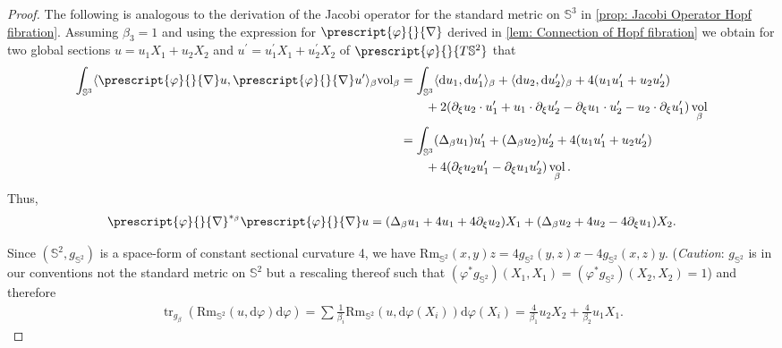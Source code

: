 \documentclass{article}
\numberwithin{equation}{section}        %
\theoremstyle{bfnote}
\theoremstyle{definition}
\theoremstyle{bfremark}
\newcommand{\Sp}{\mathbb{S}}                %
\newcommand{\diff}{\mathrm{d}}                      %
\DeclareMathOperator{\vol}{vol}                 %
\DeclareMathOperator{\tr}{tr}                   %
\begin{document}
\begin{proof}
    The following is analogous to the derivation of the Jacobi operator for the standard metric on $\Sp^3$ in \cref{prop: Jacobi Operator Hopf fibration}. Assuming $\beta_3=1$ and using the expression for $\prescript{\varphi}{}{\nabla}$ derived in \cref{lem: Connection of Hopf fibration} we obtain for two global sections $u= u_1 X_1 + u_2 X_2$ and $u^\prime = u_1^\prime X_1 + u_2^\prime X_2$ of $\prescript{\varphi}{}{T\Sp^2}$ that
    \begin{align*}
        \int_{\Sp^3} \langle \prescript{\varphi}{}{\nabla} u, \prescript{\varphi}{}{\nabla} u^\prime \rangle_\beta \mathrm{vol}_\beta &= \int_{\Sp^3} \langle \diff u_1, \diff u_1^\prime \rangle_\beta + \langle \diff u_2, \diff u_2^\prime \rangle_\beta + 4 (u_1 u_1^\prime + u_2 u_2^\prime ) \\
        &\qquad + 2 (\partial_\xi u_2 \cdot u_1^\prime + u_1 \cdot \partial_\xi u_2^\prime - \partial_\xi u_1 \cdot u_2^\prime - u_2 \cdot \partial_\xi u_1^\prime) \vol_{\beta} \\
        &= \int_{\Sp^3} (\Delta_{\beta} u_1) u_1^\prime + (\Delta_{\beta} u_2) u_2^\prime + 4 (u_1u_1^\prime + u_2 u_2^\prime) \\
        & \qquad + 4( \partial_\xi u_2 u_1^\prime - \partial_\xi u_1 u_2^\prime) \vol_\beta.
    \end{align*}
    Thus, 
    \begin{align*} 
        \prescript{\varphi}{}{\nabla}^{*_\beta}\prescript{\varphi}{}{\nabla} u = (\Delta_\beta u_1 + 4u_1 + 4 \partial_\xi u_2) X_1 + (\Delta_\beta u_2 + 4u_2 - 4 \partial_\xi u_1) X_2. 
    \end{align*}

    Since $(\Sp^2,g_{\Sp^2})$ is a space-form of constant sectional curvature 4, we have $\mathrm{Rm}_{\Sp^2}(x,y)z = 4 g_{\Sp^2}(y,z)x - 4 g_{\Sp^2}(x,z)y$. (\textit{Caution}: $g_{\Sp^2}$ is in our conventions not the standard metric on $\Sp^2$ but a rescaling thereof such that $(\varphi^*g_{\Sp^2})(X_1,X_1)= (\varphi^*g_{\Sp^2})(X_2,X_2)=1$) and therefore
    \begin{align*} 
        \tr_{g_\beta}(\mathrm{Rm}_{\Sp^2}(u,\diff \varphi)\diff \varphi) = \sum \tfrac{1}{\beta_i}\mathrm{Rm}_{\Sp^2}(u,\diff\varphi(X_i))\diff\varphi(X_i) = \tfrac{4}{\beta_1} u_2 X_2 + \tfrac{4}{\beta_2} u_1 X_1.
    \end{align*}


\end{proof}
\end{document}
